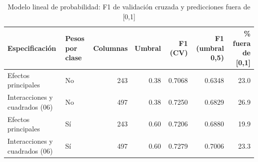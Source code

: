 \begin{table}

\caption{\label{tab:lpm}Modelo lineal de probabilidad: F1 de validación cruzada y predicciones fuera de [0,1]}
\centering
\begin{tabular}[t]{llrrrrr}
\toprule
Especificación & Pesos por clase & Columnas & Umbral & F1 (CV) & F1 (umbral 0,5) & \% fuera de [0,1]\\
\midrule
Efectos principales & No & 243 & 0.38 & 0.7068 & 0.6348 & 23.0\\
Interacciones y cuadrados (06) & No & 497 & 0.38 & 0.7250 & 0.6829 & 26.9\\
Efectos principales & Sí & 243 & 0.60 & 0.7206 & 0.6880 & 19.9\\
Interacciones y cuadrados (06) & Sí & 497 & 0.60 & 0.7279 & 0.7006 & 23.3\\
\bottomrule
\end{tabular}
\end{table}
